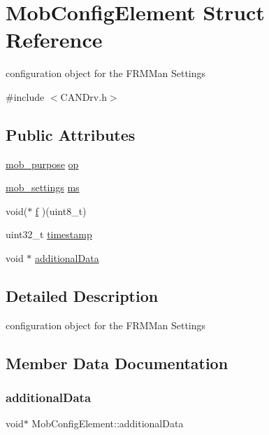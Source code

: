 \hypertarget{struct_mob_config_element}{}\section{Mob\+Config\+Element Struct Reference}
\label{struct_mob_config_element}


configuration object for the F\+R\+M\+Man Settings  




{\ttfamily \#include $<$C\+A\+N\+Drv.\+h$>$}

\subsection*{Public Attributes}
\begin{DoxyCompactItemize}
\item 
\hyperlink{_c_a_n_drv_8h_a96ec3cdb380b685d106b8ce4ff42eaf7}{mob\+\_\+purpose} \hyperlink{struct_mob_config_element_ae38609249414f8dfeb6963cf809ec5b5}{op}
\item 
\hyperlink{structmob__settings}{mob\+\_\+settings} \hyperlink{struct_mob_config_element_a714796794c4e9552b2ab4d452c11b1cc}{ms}
\item 
void($\ast$ \hyperlink{struct_mob_config_element_aa841e041e2beab702a5575da5b8b3915}{f} )(uint8\+\_\+t)
\item 
uint32\+\_\+t \hyperlink{struct_mob_config_element_ac1d741b833732292b163b0475363900a}{timestamp}
\item 
void $\ast$ \hyperlink{struct_mob_config_element_aeb70966d805b5bf95be93856cf755453}{additional\+Data}
\end{DoxyCompactItemize}


\subsection{Detailed Description}
configuration object for the F\+R\+M\+Man Settings 

\subsection{Member Data Documentation}
\hypertarget{struct_mob_config_element_aeb70966d805b5bf95be93856cf755453}{}\label{struct_mob_config_element_aeb70966d805b5bf95be93856cf755453} 
\subsubsection{\texorpdfstring{additional\+Data}{additionalData}}
{\footnotesize\ttfamily void$\ast$ Mob\+Config\+Element\+::additional\+Data}

